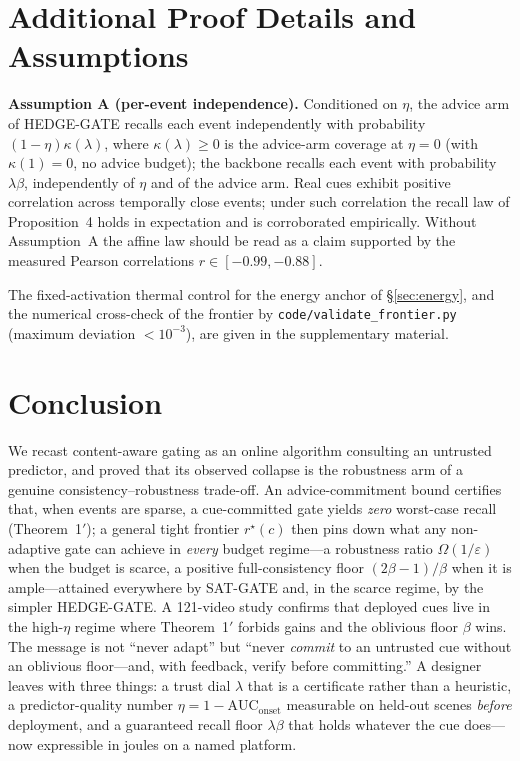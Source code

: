 ﻿\documentclass[lettersize,journal]{IEEEtran}
\begin{document}
\section{Additional Proof Details and Assumptions}\label{sec:appx}
\textbf{Assumption A (per-event independence).} Conditioned on $\eta$, the advice arm of HEDGE-GATE recalls each event independently with probability $(1{-}\eta)\kappa(\lambda)$, where $\kappa(\lambda)\ge0$ is the advice-arm coverage at $\eta{=}0$ (with $\kappa(1){=}0$, no advice budget); the backbone recalls each event with probability $\lambda\beta$, independently of $\eta$ and of the advice arm. Real cues exhibit positive correlation across temporally close events; under such correlation the recall law of Proposition~4 holds in expectation and is corroborated empirically. Without Assumption~A the affine law should be read as a claim supported by the measured Pearson correlations $r\in[-0.99,-0.88]$.

\noindent The fixed-activation thermal control for the energy anchor of \S\ref{sec:energy}, and the numerical cross-check of the frontier by \texttt{code/validate\_frontier.py} (maximum deviation $<10^{-3}$), are given in the supplementary material.

\section{Conclusion}\label{sec:conc}
We recast content-aware gating as an online algorithm consulting an untrusted predictor, and proved that its observed collapse is the robustness arm of a genuine consistency--robustness trade-off. An advice-commitment bound certifies that, when events are sparse, a cue-committed gate yields \emph{zero} worst-case recall (Theorem~1$'$); a general tight frontier $r^\star(c)$ then pins down what any non-adaptive gate can achieve in \emph{every} budget regime---a robustness ratio $\Omega(1/\varepsilon)$ when the budget is scarce, a positive full-consistency floor $(2\beta-1)/\beta$ when it is ample---attained everywhere by SAT-GATE and, in the scarce regime, by the simpler HEDGE-GATE. A 121-video study confirms that deployed cues live in the high-$\eta$ regime where Theorem~1$'$ forbids gains and the oblivious floor $\beta$ wins. The message is not ``never adapt'' but ``never \emph{commit} to an untrusted cue without an oblivious floor---and, with feedback, verify before committing.'' A designer leaves with three things: a trust dial $\lambda$ that is a certificate rather than a heuristic, a predictor-quality number $\eta=1-\mathrm{AUC}_{\text{onset}}$ measurable on held-out scenes \emph{before} deployment, and a guaranteed recall floor $\lambda\beta$ that holds whatever the cue does---now expressible in joules on a named platform.
\end{document}
